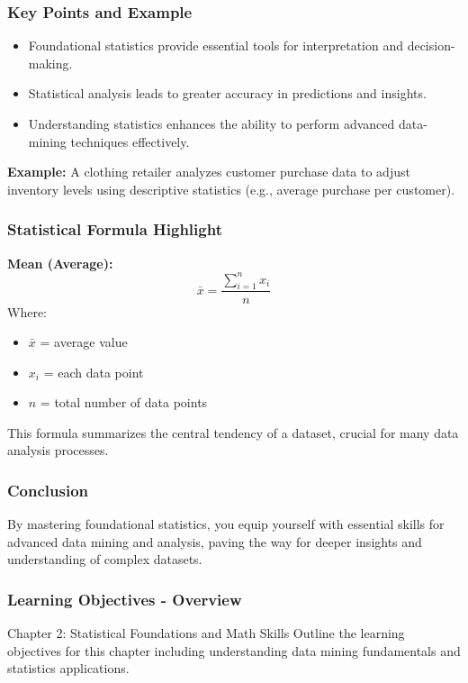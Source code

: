 \documentclass[aspectratio=169]{beamer}
\begin{document}
\begin{frame}[fragile]
    \frametitle{Key Points and Example}
    \begin{itemize}
        \item Foundational statistics provide essential tools for interpretation and decision-making.
        \item Statistical analysis leads to greater accuracy in predictions and insights.
        \item Understanding statistics enhances the ability to perform advanced data-mining techniques effectively.
    \end{itemize}
    
    \textbf{Example:} A clothing retailer analyzes customer purchase data to adjust inventory levels using descriptive statistics (e.g., average purchase per customer).
\end{frame}

\begin{frame}[fragile]
    \frametitle{Statistical Formula Highlight}
    \textbf{Mean (Average):}  
    \begin{equation}
        \bar{x} = \frac{\sum_{i=1}^n x_i}{n}
    \end{equation}
    Where:
    \begin{itemize}
        \item $\bar{x}$ = average value
        \item $x_i$ = each data point
        \item $n$ = total number of data points
    \end{itemize}
    This formula summarizes the central tendency of a dataset, crucial for many data analysis processes.
\end{frame}

\begin{frame}[fragile]
    \frametitle{Conclusion}
    By mastering foundational statistics, you equip yourself with essential skills for advanced data mining and analysis, paving the way for deeper insights and understanding of complex datasets.
\end{frame}

\begin{frame}[fragile]
    \frametitle{Learning Objectives - Overview}
    \begin{block}{Chapter 2: Statistical Foundations and Math Skills}
        Outline the learning objectives for this chapter including understanding data mining fundamentals and statistics applications.
    \end{block}
\end{frame}
\end{document}
